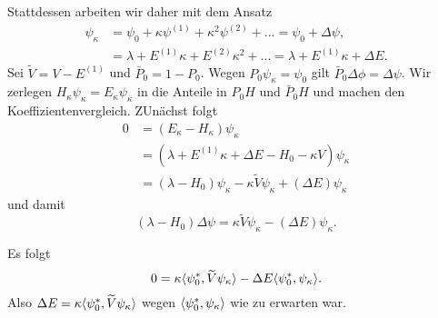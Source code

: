 \documentclass{mycourse}
\begin{document}
Stattdessen arbeiten wir daher mit dem Ansatz
\begin{align*}
\psi_\kappa&=\psi_0 + \kappa \psi^{(1)} + \kappa^2 \psi^{(2)} + ... = \psi_0 + \Delta\psi,\\
&= \lambda + E^{(1)} \kappa + E^{(2)} \kappa^2 +... = \lambda + E^{(1)} \kappa + \Delta E.
\end{align*}
Sei $\tilde V = V- E^{(1)}$ und $\bar P_0 = 1- P_0$. Wegen $P_0 \psi_\kappa = \psi_0$ gilt $\bar P_0\Delta \phi = \Delta \psi$. Wir zerlegen $H_\kappa \psi_\kappa = E_\kappa \psi_\kappa$ in die Anteile in $P_0 H$ und $\bar P_0 H$ und machen den Koeffizientenvergleich. ZUnächst folgt
\begin{align*}
0 &= (E_\kappa - H_\kappa) \psi_\kappa \\
&=(\lambda + E^{(1)} \kappa + \Delta E - H_0 - \kappa V) \psi_\kappa \\
&= (\lambda-H_0) \psi_\kappa - \kappa \tilde V \psi_\kappa + (\Delta E) \psi_\kappa
\end{align*}
und damit
\begin{equation}\label{2.1}
(\lambda-H_0) \Delta \psi = \kappa \tilde V \psi_\kappa - (\Delta E) \psi_\kappa.
\end{equation}
\begin{seg}
Es folgt
\[
0=\kappa \langle \psi_0^*, \widetilde V \psi_\kappa\rangle - \Delta E\langle \psi_0^*, \psi_\kappa\rangle.
\]
Also $\Delta E= \kappa \langle \psi_0^*, \widetilde V \psi_\kappa\rangle$ wegen $\langle \psi_0^*, \psi_\kappa\rangle$ wie zu erwarten war.
\end{seg}
\end{document}
